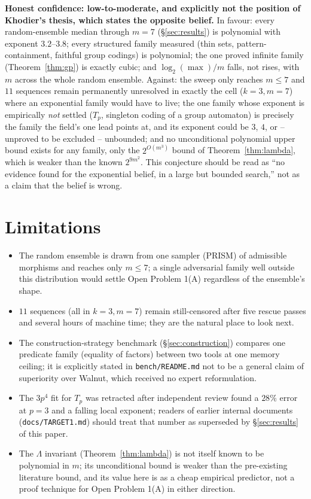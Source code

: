 \documentclass[11pt]{article}
\begin{document}
\textbf{Honest confidence: low-to-moderate, and explicitly not the position of Khodier's
thesis, which states the opposite belief.} In favour: every random-ensemble median
through $m=7$ (\S\ref{sec:results}) is polynomial with exponent $3.2$--$3.8$; every
structured family measured (thin sets, pattern-containment, faithful group codings) is
polynomial; the one proved infinite family (Theorem~\ref{thm:gp}) is exactly cubic; and
$\log_2(\max)/m$ falls, not rises, with $m$ across the whole random ensemble. Against: the
sweep only reaches $m\le7$ and $11$ sequences remain permanently unresolved in exactly the
cell ($k=3,m=7$) where an exponential family would have to live; the one family whose
exponent is empirically \emph{not} settled ($T_p$, singleton coding of a group automaton)
is precisely the family the field's one lead points at, and its exponent could be $3$,
$4$, or -- unproved to be excluded -- unbounded; and no unconditional polynomial upper
bound exists for any family, only the $2^{O(m^3)}$ bound of Theorem~\ref{thm:lambda},
which is weaker than the known $2^{9m^2}$. This conjecture should be read as ``no evidence
found for the exponential belief, in a large but bounded search,'' not as a claim that the
belief is wrong.

\section{Limitations}
\label{sec:limitations}

\begin{itemize}
\item The random ensemble is drawn from one sampler (PRISM) of admissible morphisms and
reaches only $m\le7$; a single adversarial family well outside this distribution would
settle Open Problem 1(A) regardless of the ensemble's shape.
\item $11$ sequences (all in $k=3,m=7$) remain still-censored after five rescue passes and
several hours of machine time; they are the natural place to look next.
\item The construction-strategy benchmark (\S\ref{sec:construction}) compares one
predicate family (equality of factors) between two tools at one memory ceiling; it is
explicitly stated in \texttt{bench/README.md} not to be a general claim of superiority
over Walnut, which received no expert reformulation.
\item The $3p^4$ fit for $T_p$ was retracted after independent review found a $28\%$
error at $p=3$ and a falling local exponent; readers of earlier internal documents
(\texttt{docs/TARGET1.md}) should treat that number as superseded by
\S\ref{sec:results} of this paper.
\item The $\Lambda$ invariant (Theorem~\ref{thm:lambda}) is not itself known to be
polynomial in $m$; its unconditional bound is weaker than the pre-existing literature
bound, and its value here is as a cheap empirical predictor, not a proof technique for
Open Problem 1(A) in either direction.
\end{itemize}
\end{document}
